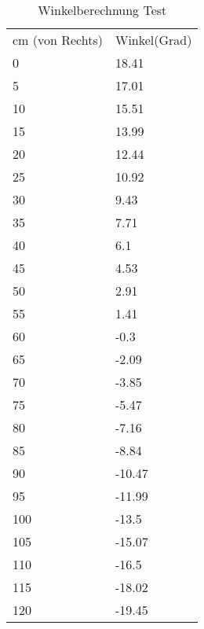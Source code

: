 \begin{table}[htbp]
  \centering
  \caption{Winkelberechnung Test}
    \begin{tabular}{ll}
    
    cm (von Rechts) & Winkel(Grad)  \\
    
    0     & 18.41 \\
    5     & 17.01 \\
    10    & 15.51 \\
    15    & 13.99 \\
    20    & 12.44 \\
    25    & 10.92 \\
    30    & 9.43 \\
    35    & 7.71 \\
    40    & 6.1 \\
    45    & 4.53 \\
    50    & 2.91 \\
    55    & 1.41 \\
    60    & -0.3 \\
    65    & -2.09 \\
    70    & -3.85 \\
    75    & -5.47 \\
    80    & -7.16 \\
    85    & -8.84 \\
    90    & -10.47 \\
    95    & -11.99 \\
    100   & -13.5 \\
    105   & -15.07 \\
    110   & -16.5 \\
    115   & -18.02 \\
    120   & -19.45 \\
    
    \end{tabular}%
  \label{tab:addlabel}%
\end{table}%

